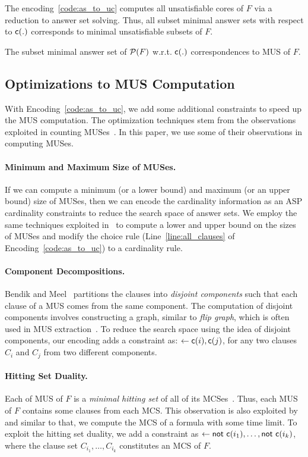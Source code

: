 The encoding~\ref{code:as_to_uc} computes all unsatisfiable cores of $F$ via a reduction to answer set solving. Thus, all subset minimal answer sets 
with respect to $\mathsf{c}(.)$ corresponds to minimal unsatisfiable subsets of $F$.
\begin{proposition}
The subset minimal answer set of $\mathcal{P}(F)$ w.r.t. $\mathsf{c}(.)$ correspondences to MUS of $F$.
\end{proposition}

\subsection{Optimizations to MUS Computation}
With Encoding~\ref{code:as_to_uc}, we add some additional constraints to speed up the MUS computation. 
The optimization techniques stem from the observations exploited in counting MUSes~\cite{BM2021}.
In this paper, we use some of their observations in computing MUSes. 

\paragraph{Minimum and Maximum Size of MUSes.}
If we can compute a minimum (or a lower bound) and maximum (or an upper bound) size of MUSes, then we can encode the cardinality information as an ASP cardinality constraints to reduce the search space of answer sets. 
We employ the same techniques exploited in~\cite{BM2021} to compute a lower and upper bound on the sizes of MUSes and modify the choice rule (Line~\ref{line:all_clauses} of Encoding~\ref{code:as_to_uc}) to a cardinality rule. 

\paragraph{Component Decompositions.}
Bendik and Meel~\cite{BM2021} partitions the clauses into {\em disjoint components} such that each clause of a MUS comes from the same component. 
The computation of disjoint components involves constructing a graph, similar to {\em flip graph}, which is often used in MUS extraction~\cite{Wieringa2012}.
To reduce the search space using the idea of disjoint components, our encoding adds a constraint as: $\leftarrow \mathsf{c}(i), \mathsf{c}(j)$, for any two clauses $C_i$ and $C_j$ from two different components.   

\paragraph{Hitting Set Duality.}
Each of MUS of $F$ is a {\em minimal hitting set} of all of its MCSes~\cite{DW1987,Reiter1987}.
Thus, each MUS of $F$ contains some clauses from each MCS. 
This observation is also exploited by~\cite{BM2021} and similar to that, we compute the MCS of a formula with some time limit. 
To exploit the hitting set duality, we add a constraint as $\leftarrow \mathsf{not}\text{ } \mathsf{c}(i_1), \ldots, \mathsf{not}\text{ } \mathsf{c}(i_k)$, 
where the clause set $C_{i_1}, \ldots, C_{i_k}$ constitutes an MCS of $F$.